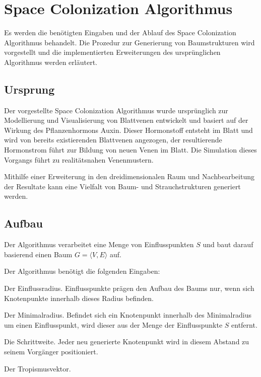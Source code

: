\chapter{Space Colonization Algorithmus} \label{ch:SCA}

Es werden die benötigten Eingaben und der Ablauf des Space Colonization Algorithmus behandelt. Die Prozedur zur Generierung von Baumstrukturen wird vorgestellt und die implementierten Erweiterungen des ursprünglichen Algorithmus werden erläutert.

\section{Ursprung}
Der vorgestellte Space Colonization Algorithmus wurde ursprünglich zur Modellierung und Visualisierung von Blattvenen entwickelt und basiert auf der Wirkung des Pflanzenhormons Auxin. Dieser Hormonstoff entsteht im Blatt und wird von bereits existierenden Blattvenen angezogen, der resultierende Hormonstrom führt zur Bildung von neuen Venen im Blatt. Die Simulation dieses Vorgangs führt zu realitätsnahen Venenmustern. \cite[S.3]{LeafVenation:05}

Mithilfe einer Erweiterung in den dreidimensionalen Raum und Nachbearbeitung der Resultate kann eine Vielfalt von Baum- und Strauchstrukturen generiert werden. \cite[S.2]{SpaceColonizationAlgorithm:07}

\section{Aufbau}

Der Algorithmus verarbeitet eine Menge von Einflusspunkten $S$ und baut darauf basierend einen Baum $G = \langle V,E \rangle$ auf. 

Der Algorithmus benötigt die folgenden Eingaben:

\begin{description}[labelindent]
	\item[\boldmath$d_i$] Der Einflussradius. Einflusspunkte prägen den Aufbau des Baums nur, wenn sich Knotenpunkte innerhalb dieses Radius befinden. \cite[S.3]{SpaceColonizationAlgorithm:07}\\
	
	\item[\boldmath$d_k$] Der Minimalradius. Befindet sich ein Knotenpunkt innerhalb des Minimalradius um einen Einflusspunkt, wird dieser aus der Menge der Einflusspunkte $S$ entfernt. \cite[S.3]{SpaceColonizationAlgorithm:07}\\
	
	\item[\boldmath$D$] Die Schrittweite. Jeder neu generierte Knotenpunkt wird in diesem Abstand zu seinem Vorgänger positioniert. \cite[S.3]{SpaceColonizationAlgorithm:07} \\
	
	\item[\boldmath$\overrightarrow{T}$] Der Tropismusvektor. \cite[S.3]{SpaceColonizationAlgorithm:07}

\end{description}

